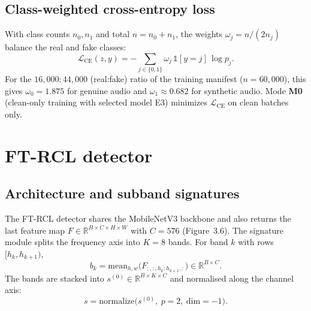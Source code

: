 \documentclass[12pt,a4paper]{report}
\begin{document}
\subsection{Class-weighted cross-entropy loss}

With class counts $n_0, n_1$ and total $n = n_0 + n_1$, the weights $\omega_j = n / (2 n_j)$ balance the real and fake classes:
\begin{equation}
\mathcal{L}_{\mathrm{CE}}(z, y) = -\sum_{j \in \{0,1\}} \omega_j \,\mathbb{1}[y=j]\,\log p_j .
\label{eq:ce}
\end{equation}
For the $16{,}000:44{,}000$ (real:fake) ratio of the training manifest ($n=60{,}000$), this gives $\omega_0 = 1.875$ for genuine audio and $\omega_1 \approx 0.682$ for synthetic audio. Mode \textbf{M0} (clean-only training with selected model E3) minimizes $\mathcal{L}_{\mathrm{CE}}$ on clean batches only.

\section{FT-RCL detector}
\label{sec:ftrcl}

\subsection{Architecture and subband signatures}

The FT-RCL detector shares the MobileNetV3 backbone and also returns the last feature map $F \in \mathbb{R}^{B \times C \times H \times W}$ with $C=576$ (Figure~3.6). The signature module splits the frequency axis into $K=8$ bands. For band $k$ with rows $[h_k, h_{k+1})$,
\begin{equation}
b_k = \mathrm{mean}_{h,w}\big(F_{:,:,h_k:h_{k+1},:}\big) \in \mathbb{R}^{B \times C}.
\label{eq:subband}
\end{equation}
The bands are stacked into $s^{(0)} \in \mathbb{R}^{B \times K \times C}$ and normalised along the channel axis:
\begin{equation}
s = \mathrm{normalize}\big(s^{(0)},\ p=2,\ \mathrm{dim}=-1\big).
\label{eq:signature}
\end{equation}
\end{document}
